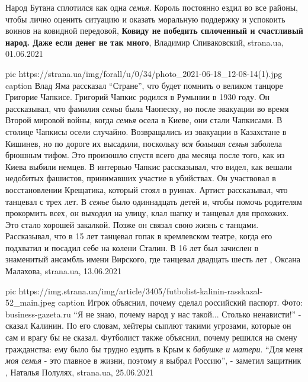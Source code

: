  
 
 
 
 
Народ Бутана сплотился как одна \emph{семья}. Король постоянно ездил во все районы,
чтобы лично оценить ситуацию и оказать моральную поддержку и успокоить воинов
на ковидной передовой, \textbf{Ковиду не победить сплоченный и счастливый
народ. Даже если денег не так много}, Владимир Спиваковский, strana.ua,
01.06.2021

\ifcmt
  pic https://strana.ua/img/forall/u/0/34/photo_2021-06-18_12-08-14(1).jpg
	caption Влад Яма рассказал \enquote{Стране}, что будет помнить о великом танцоре Григорие Чапкисе.
\fi
Григорий Чапкис родился в Румынии в 1930 году. Он рассказывал, что фамилия
\emph{семьи} была Чаопеску, но после эвакуации во время Второй мировой войны,
когда \emph{семья} осела в Киеве, они стали Чапкисами.  В столице Чапкисы осели
случайно.  Возвращались из эвакуации в Казахстане в Кишинев, но по дороге их
высадили, поскольку \emph{вся большая семья} заболела брюшным тифом. Это
произошло спустя всего два месяца после того, как из Киева выбили немцев. В
интервью Чапкис рассказывал, что видел, как вешали недобитых фашистов,
принимавших участие в убийствах. Он участвовал в восстановлении Крещатика,
который стоял в руинах.  Артист рассказывал, что танцевал с трех лет. В
\emph{семье} было одиннадцать детей и, чтобы помочь родителям прокормить всех,
он выходил на улицу, клал шапку и танцевал для прохожих. Это стало хорошей
закалкой.  Позже он связал свою жизнь с танцами. Рассказывал, что в 15 лет
танцевал гопак в кремлевском театре, когда его подхватил и посадил себе на
колени Сталин.  В 16 лет был зачислен в знаменитый ансамбль имени Вирского, где
танцевал двадцать шесть лет
, 
Оксана Малахова, strana.ua, 13.06.2021

\ifcmt
  pic https://img.strana.ua/img/article/3405/futbolist-kalinin-rasskazal-52_main.jpeg
	caption Игрок объяснил, почему сделал российский паспорт. Фото: business-gazeta.ru
\fi
\enquote{Я не знаю, почему народ у нас такой... Столько ненависти!} - сказал Калинин.
По его словам, хейтеры сыплют такими угрозами, которые он сам и врагу бы не
сказал. Футболист также объяснил, почему решился на смену гражданства: ему
было бы трудно ездить в Крым к \emph{бабушке и матери}.  \enquote{Для меня \emph{моя семья} - это
главное в жизни, поэтому я выбрал Россию}, - заметил защитник
, 
Наталья Полулях, strana.ua, 25.06.2021

